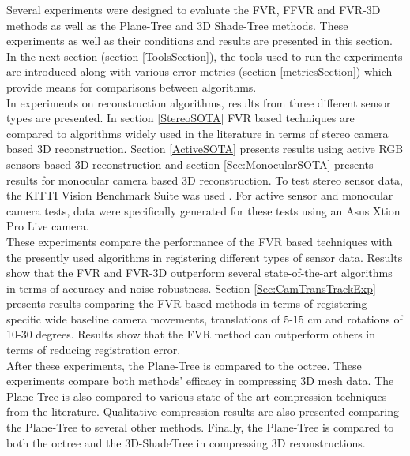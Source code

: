 Several experiments were designed to evaluate the FVR, FFVR and FVR-3D methods as well as the Plane-Tree and 3D Shade-Tree methods. These experiments as well as their conditions and results are presented in this section. In the next section (section \ref{ToolsSection}), the tools used to run the experiments are introduced along with various error metrics (section \ref{metricsSection}) which provide means for comparisons between algorithms. \\

In experiments on reconstruction algorithms, results from three different sensor types are presented. In section \ref{StereoSOTA} FVR based techniques are compared to algorithms widely used in the literature in terms of stereo camera based 3D reconstruction. Section \ref{ActiveSOTA} presents results using active RGB sensors based 3D reconstruction and section \ref{Sec:MonocularSOTA} presents results for monocular camera based 3D reconstruction. To test stereo sensor data, the KITTI Vision Benchmark Suite was used \cite{Geiger13Vision}. For active sensor and monocular camera tests, data were specifically generated for these tests using an Asus Xtion Pro Live camera. \\

These experiments compare the performance of the FVR based techniques with the presently used algorithms in registering different types of sensor data. Results show that the FVR and FVR-3D outperform several state-of-the-art algorithms in terms of accuracy and noise robustness. Section \ref{Sec:CamTransTrackExp} presents results comparing the FVR based methods in terms of registering specific wide baseline camera movements, translations of 5-15 cm and rotations of 10-30 degrees. Results show that the FVR method can outperform others in terms of reducing registration error. \\

After these experiments, the Plane-Tree is compared to the octree. These experiments compare both methods' efficacy in compressing 3D mesh data. The Plane-Tree is also compared to various state-of-the-art compression techniques from the literature. Qualitative compression results are also presented comparing the Plane-Tree to several other methods. Finally, the Plane-Tree is compared to both the octree and the 3D-ShadeTree in compressing 3D reconstructions. \\

